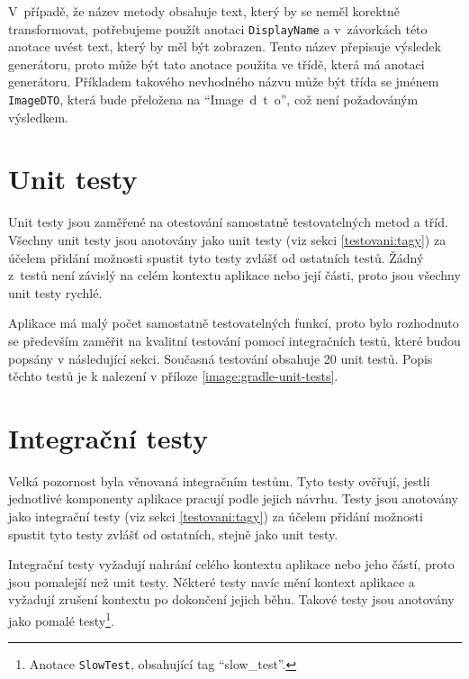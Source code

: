     V~případě, že název metody obsahuje text, který by se neměl korektně transformovat, potřebujeme použít anotaci \verb|DisplayName| a v~závorkách této anotace uvést text, který by měl být zobrazen. Tento název přepisuje výsledek generátoru, proto může být tato anotace použita ve třídě, která má anotaci generátoru. Příkladem takového nevhodného názvu může být třída se jménem \verb|ImageDTO|, která bude přeložena na \enquote{Image~d~t~o}, což není požadováným výsledkem.
    
\section{Unit testy}\label{testovani:unit}
    Unit testy jsou zaměřené na otestování samostatně testovatelných metod a tříd. Všechny unit testy jsou anotovány jako unit testy (viz sekci \ref{testovani:tagy}) za účelem přidání možnosti spustit tyto testy zvlášť od ostatních testů. Žádný z~testů není závislý na celém kontextu aplikace nebo její části, proto jsou všechny unit testy rychlé.
    
    Aplikace má malý počet samostatně testovatelných funkcí, proto bylo rozhodnuto se především zaměřit na kvalitní testování pomocí integračních testů, které budou popsány v následující sekci. Současná testování obsahuje 20 unit testů. Popis těchto testů je k nalezení v příloze \ref{image:gradle-unit-tests}.
    
\section{Integrační testy}\label{testovani:intergacni}
    Velká pozornost byla věnovaná integračním testům. Tyto testy ověřují, jestli jednotlivé komponenty aplikace pracují podle jejich návrhu. Testy jsou anotovány jako integrační testy (viz sekci \ref{testovani:tagy}) za účelem přidání možnosti spustit tyto testy zvlášť od ostatních, stejně jako unit testy. 
    
    Integrační testy vyžadují nahrání celého kontextu aplikace nebo jeho částí, proto jsou pomalejší než unit testy. Některé testy navíc mění kontext aplikace a vyžadují zrušení kontextu po dokončení jejich běhu. Takové testy jsou anotovány jako pomalé testy\footnote{Anotace \texttt{SlowTest}, obsahující tag \enquote{slow\_test}.}.
    
